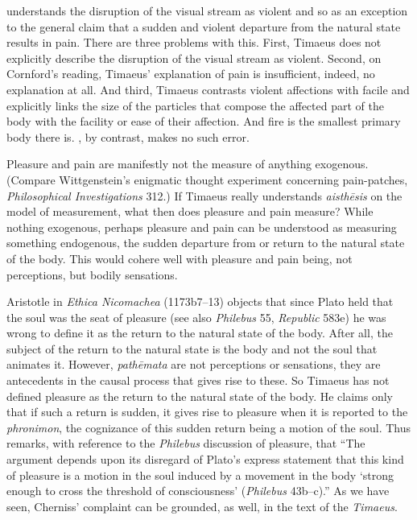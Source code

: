 \citet[269]{Cornford:1935fk} understands the disruption of the visual stream as violent and so as an exception to the general claim that a sudden and violent departure from the natural state results in pain. There are three problems with this. First, Timaeus does not explicitly describe the disruption of the visual stream as violent. Second, on Cornford's reading, Timaeus' explanation of pain is insufficient, indeed, no explanation at all. And third, Timaeus contrasts violent affections with facile and explicitly links the size of the particles that compose the affected part of the body with the facility or ease of their affection. And fire is the smallest primary body there is. \citet[447]{Taylor:1928qb}, by contrast, makes no such error.

Pleasure and pain are manifestly not the measure of anything exogenous. (Compare Wittgenstein's enigmatic thought experiment concerning pain-patches, \emph{Philosophical Investigations} 312.) If Timaeus really understands \emph{aisthēsis} on the model of measurement, what then does pleasure and pain measure? While nothing exogenous, perhaps pleasure and pain can be understood as measuring something endogenous, the sudden departure from or return to the natural state of the body. This would cohere well with pleasure and pain being, not perceptions, but bodily sensations.

Aristotle in \emph{Ethica Nicomachea} (1173b7--13) objects that since Plato held that the soul was the seat of pleasure (see also \emph{Philebus} 55, \emph{Republic} 583e) he was wrong to define it as the return to the natural state of the body. After all, the subject of the return to the natural state is the body and not the soul that animates it. However, \emph{pathēmata} are not perceptions or sensations, they are antecedents in the causal process that gives rise to these. So Timaeus has not defined pleasure as the return to the natural state of the body. He claims only that if such a return is sudden, it gives rise to pleasure when it is reported to the \emph{phronimon}, the cognizance of this sudden return being a motion of the soul. Thus \citet[403 n328]{Cherniss:1944aa} remarks, with reference to the \emph{Philebus} discussion of pleasure, that ``The argument depends upon its disregard of Plato's express statement that this kind of pleasure is a motion in the soul induced by a movement in the body `strong enough to cross the threshold of consciousness' (\emph{Philebus} 43b--c).'' As we have seen, Cherniss' complaint can be grounded, as well, in the text of the \emph{Timaeus}.

